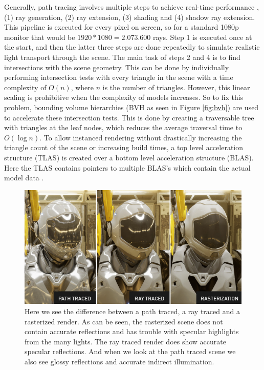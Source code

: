 Generally, path tracing involves multiple steps to achieve real-time performance \cite{laine2013megakernels}, (1) ray generation, (2) ray extension, (3) shading and (4) shadow ray extension. This pipeline is executed for every pixel on screen, so for a standard 1080p monitor that would be $1920*1080=2.073.600$ rays. Step 1 is executed once at the start, and then the latter three steps are done repeatedly to simulate realistic light transport through the scene. The main task of steps 2 and 4 is to find intersections with the scene geometry. This can be done by individually performing intersection tests with every triangle in the scene with a time complexity of $O(n)$, where $n$ is the number of triangles. However, this linear scaling is prohibitive when the complexity of models increases. So to fix this problem, bounding volume hierarchies (BVH as seen in Figure \ref{fig:bvh}) are used to accelerate these intersection tests. This is done by creating a traversable tree with triangles at the leaf nodes, which reduces the average traversal time to  $O(\log n)$. To allow instanced rendering without drastically increasing the triangle count of the scene or increasing build times, a top level acceleration structure (TLAS) is created over a bottom level acceleration structure (BLAS). Here the TLAS contains pointers to multiple BLAS's which contain the actual model data \cite{VulkanAccelerationStructures}.

\begin{figure}
    \centering
    \includegraphics[width=\linewidth]{figures/nvidia_ray_path_rasterization.png}
    \caption{Here we see the difference between a path traced, a ray traced and a rasterized render. As can be seen, the rasterized scene does not contain accurate reflections and has trouble with specular highlights from the many lights. The ray traced render does show accurate specular reflections. And when we look at the path traced scene we also see glossy reflections and accurate indirect illumination. \cite{NVIDIAPathRayRaster}}
    \label{fig:path_ray_raster}
\end{figure}

